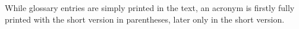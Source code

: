 \documentclass[parskip=half]{scrartcl}
\begin{document}
While glossary entries are simply
printed in the text, an acronym
is firstly fully printed with the short version
in parentheses, later only in the short version.
\printindex
\end{document}
